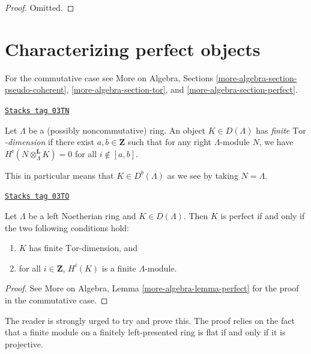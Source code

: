 \begin{proof}
Omitted.
\end{proof}

\section{Characterizing perfect objects}
\label{trace-section-characterizing-perfect}
For the commutative case see
More on Algebra, Sections
\ref{more-algebra-section-pseudo-coherent},
\ref{more-algebra-section-tor}, and
\ref{more-algebra-section-perfect}.

\begin{definition}
\label{trace-definition-finite-tor-dimension}
\href{https://stacks.math.columbia.edu/tag/03TN}{\texttt{Stacks tag 03TN}}

Let $\Lambda$ be a (possibly noncommutative) ring.
An object $K\in D(\Lambda)$ has {\it finite $\text{Tor}$-dimension}
if there exist $a, b \in \mathbf{Z}$ such that for any
right $\Lambda$-module $N$, we have
$H^i(N \otimes_{\Lambda}^\mathbf{L} K) = 0$ for all
$i \not \in [a, b]$.
\end{definition}

This in particular means that $K \in D^b(\Lambda)$ as we see by taking
$N = \Lambda$.

\begin{lemma}
\label{trace-lemma-characterize-perfect}
\href{https://stacks.math.columbia.edu/tag/03TO}{\texttt{Stacks tag 03TO}}

Let $\Lambda$ be a left Noetherian ring and $K\in D(\Lambda)$. Then $K$ is
perfect if and only if the two following conditions hold:
\begin{enumerate}
\item
$K$ has finite $\text{Tor}$-dimension, and
\item
for all $i \in \mathbf{Z}$, $H^i(K)$ is a finite $\Lambda$-module.
\end{enumerate}
\end{lemma}

\begin{proof}
See More on Algebra, Lemma \ref{more-algebra-lemma-perfect}
for the proof in the commutative case.
\end{proof}

The reader is strongly urged to try and prove this. The proof relies on the
fact that a finite module on a finitely left-presented ring is flat if and only
if it is projective.

